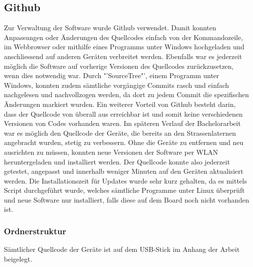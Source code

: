 \subsection{Github}
Zur Verwaltung der Software wurde Github verwendet. Damit konnten Anpassungen oder Änderungen des Quellcodes einfach von der Kommandozeile, im Webbrowser oder mithilfe eines Programms unter Windows hochgeladen und anschliessend auf anderen Geräten verbreitet werden. Ebenfalls war es jederzeit möglich die Software auf vorherige Versionen des Quellcodes zurückzusetzen, wenn dies notwendig war. Durch "'SourceTree"', einem Programm unter Windows, konnten zudem sämtliche vorgängige Commits rasch und einfach nachgelesen und nachvollzogen werden, da dort zu jedem Commit die spezifischen Änderungen markiert wurden. Ein weiterer Vorteil von Github besteht darin, dass der Quellcode von überall aus erreichbar ist und somit keine verschiedenen Versionen von Codes vorhanden waren. 
Im späteren Verlauf der Bachelorarbeit war es möglich den Quellcode der Geräte, die bereits an den Strassenlaternen angebracht wurden, stetig zu verbessern. Ohne die Geräte zu entfernen und neu ausrichten zu müssen, konnten neue Versionen der Software per WLAN heruntergeladen und installiert werden. Der Quellcode konnte also jederzeit getestet, angepasst und innerhalb weniger Minuten auf den Geräten aktualisiert werden. Die Installationszeit für Updates wurde sehr kurz gehalten, da es mittels Script durchgeführt wurde, welches sämtliche Programme unter Linux überprüft und neue Software nur installiert, falls diese auf dem Board noch nicht vorhanden ist.

\subsubsection{Ordnerstruktur}
Sämtlicher Quellcode der Geräte ist auf dem USB-Stick im Anhang der Arbeit beigelegt.

\setlength\tabcolsep{5pt}

